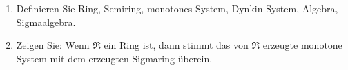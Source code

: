 
\begin{exercise}

\phantom{}

\begin{enumerate}[label = (\alph*)]
  
  \item
  Definieren Sie Ring, Semiring, monotones System, Dynkin-System, Algebra, Sigmaalgebra.

  \item
  Zeigen Sie: Wenn $\mathfrak{R}$ ein Ring ist, dann stimmt das von $\mathfrak{R}$ erzeugte monotone System mit dem erzeugten Sigmaring überein.

\end{enumerate}

\end{exercise}



